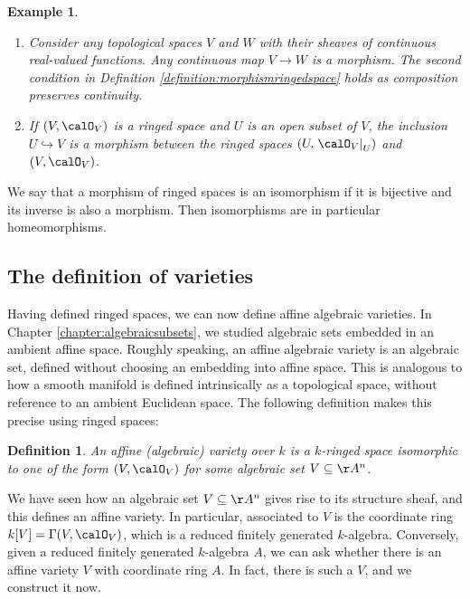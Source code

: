 \documentclass[12pt]{amsart}
\theoremstyle{plain}
\newtheorem{definition}[theorem]{Definition}
\newtheorem{example}[theorem]{Example}
\begin{document}
\begin{example}
\begin{enumerate}
\item
Consider any topological spaces $V$ and $W$ with their sheaves of continuous real-valued functions.
Any continuous map $V \to W$ is a morphism. The second condition in Definition \ref{definition:morphismringedspace} holds as composition preserves continuity.

\item
If $(V, \calO_V)$ is a ringed space and $U$ is an open subset of $V$, the inclusion $U \hookrightarrow V$ is a morphism between the ringed spaces $(U, \left. \calO_V\right|_U)$ and $(V, \calO_V)$.
\end{enumerate}
\end{example}

We say that a morphism of ringed spaces is an isomorphism if it is bijective and its inverse is also a morphism.
Then isomorphisms are in particular homeomorphisms.





\subsection{The definition of varieties}
Having defined ringed spaces, we can now define affine algebraic varieties.
In Chapter \ref{chapter:algebraicsubsets}, we studied algebraic sets embedded in an ambient affine space.
Roughly speaking, an affine algebraic variety is an algebraic set, defined without choosing an embedding into affine space.
This is analogous to how a smooth manifold is defined intrinsically as a topological space, without reference to an ambient Euclidean space.
The following definition makes this precise using ringed spaces:

\begin{definition}
An affine (algebraic) variety over $k$ is a $k$-ringed space isomorphic to one of the form $(V, \calO_V)$ for some algebraic set $V \subseteq \AA^n$.
\end{definition}


We have seen how an algebraic set $V \subseteq \AA^n$ gives rise to its structure sheaf, and this defines an affine variety.
In particular, associated to $V$ is the coordinate ring $k[V] = \Gamma(V, \calO_V)$, which is a reduced finitely generated $k$-algebra.
Conversely, given a reduced finitely generated $k$-algebra $A$, we can ask whether there is an affine variety $V$ with coordinate ring $A$.
In fact, there is such a $V$, and we construct it now.
\end{document}
